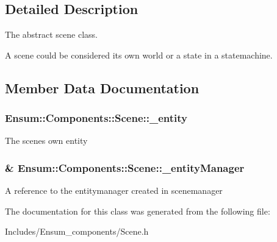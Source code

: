 \subsection{Detailed Description}
The abstract scene class. 

A scene could be considered it\textquotesingle{}s own world or a state in a statemachine. 

\subsection{Member Data Documentation}
\subsubsection[{\texorpdfstring{\+\_\+entity}{_entity}}]{ Ensum\+::\+Components\+::\+Scene\+::\+\_\+entity\hspace{0.3cm}{\ttfamily [protected]}}\hypertarget{class_ensum_1_1_components_1_1_scene_a8d36e81874a5b07e3edbd8720b8b289e}{}\label{class_ensum_1_1_components_1_1_scene_a8d36e81874a5b07e3edbd8720b8b289e}
The scenes own entity 
\subsubsection[{\texorpdfstring{\+\_\+entity\+Manager}{_entityManager}}]{\& Ensum\+::\+Components\+::\+Scene\+::\+\_\+entity\+Manager\hspace{0.3cm}{\ttfamily [protected]}}\hypertarget{class_ensum_1_1_components_1_1_scene_af7eb8e3279c5b6768f442ae05b44e75f}{}\label{class_ensum_1_1_components_1_1_scene_af7eb8e3279c5b6768f442ae05b44e75f}
A reference to the entitymanager created in scenemanager 

The documentation for this class was generated from the following file\+:\begin{DoxyCompactItemize}
\item 
Includes/\+Ensum\+\_\+components/Scene.\+h\end{DoxyCompactItemize}
